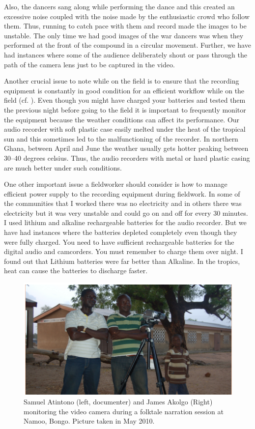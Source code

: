 \documentclass[output=paper,colorlinks,citecolor=brown]{langscibook}
\begin{document}
Also, the dancers sang along while performing the dance and this created an excessive noise coupled with the noise made by the enthusiastic crowd who follow them. Thus, running to catch pace with them and record made the images to be unstable. The only time we had good images of the war dancers was when they performed at the front of the compound in a circular movement. Further, we have had instances where some of the audience deliberately shout or pass through the path of the camera lens just to be captured in the video.

Another crucial issue to note while on the field is to ensure that the recording equipment is constantly in good condition for an efficient workflow while on the field (cf. \citealt{Bowern2015}). Even though you might have charged your batteries and tested them the previous night before going to the field it is important to frequently monitor the equipment because the weather conditions can affect its performance. Our audio recorder with soft plastic case easily melted under the heat of the tropical sun and this sometimes led to the malfunctioning of the recorder. In northern Ghana, between April and June the weather usually gets hotter peaking between 30--40 degrees celsius. Thus, the audio recorders with metal or hard plastic casing are much better under such conditions.

One other important issue a fieldworker should consider is how to manage efficient power supply to the recording equipment during fieldwork. In some of the communities that I worked there was no electricity and in others there was electricity but it was very unstable and could go on and off for every 30 minutes. I used lithium and alkaline rechargeable batteries for the audio recorder. But we have had instances where the batteries depleted completely even though they were fully charged. You need to have sufficient rechargeable batteries for the digital audio and camcorders. You must remember to charge them over night. I found out that Lithium batteries were far better than Alkaline. In the tropics, heat can cause the batteries to discharge faster.

\begin{figure}
\includegraphics[scale=0.55]{figures/samuel.png}
\caption{Samuel Atintono (left, documenter) and James Akolgo (Right) monitoring the video 
 		camera during a folktale narration session at Namoo, Bongo. Picture taken in May 2010.}

\end{figure}
\end{document}
